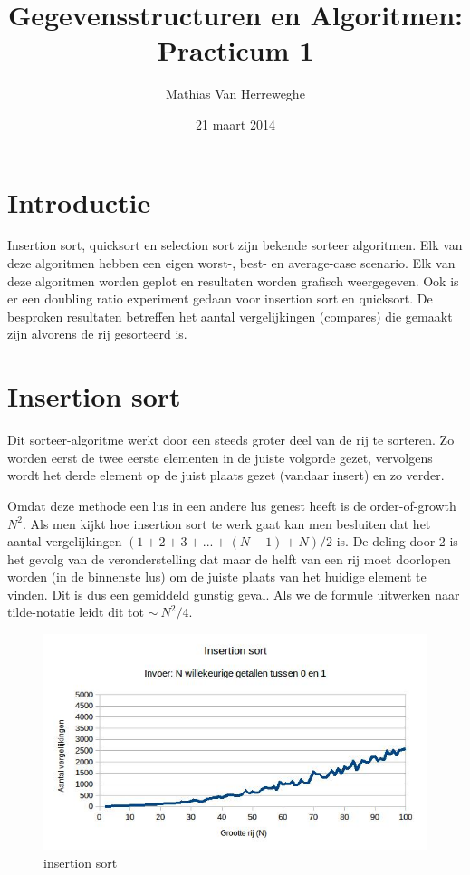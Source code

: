 \documentclass{article}
\title{Gegevensstructuren en Algoritmen: Practicum 1}
\author{Mathias Van Herreweghe }
\date{21 maart 2014}
\begin{document}
\maketitle
\newpage
\section{Introductie}
Insertion sort, quicksort en selection sort zijn bekende sorteer algoritmen. Elk van deze algoritmen hebben een eigen worst-, best- en average-case scenario. Elk van deze algoritmen worden geplot en resultaten worden grafisch weergegeven. Ook is er een doubling ratio experiment gedaan voor insertion sort en quicksort. De besproken resultaten betreffen het aantal vergelijkingen (compares) die gemaakt zijn alvorens de rij gesorteerd is.
\newpage
\section{Insertion sort}
Dit sorteer-algoritme werkt door een steeds groter deel van de rij te sorteren. Zo worden eerst de twee eerste elementen in de juiste volgorde gezet, vervolgens wordt het derde element op de juist plaats gezet (vandaar insert) en zo verder.

Omdat deze methode een lus in een andere lus genest heeft is de order-of-growth $N^2$. Als men kijkt hoe insertion sort te werk gaat kan men besluiten dat het aantal vergelijkingen $(1 + 2 + 3 + ... + (N-1) + N)/2$ is. De deling door 2 is het gevolg van de veronderstelling dat maar de helft van een rij moet doorlopen worden (in de binnenste lus) om de juiste plaats van het huidige element te vinden. Dit is dus een gemiddeld gunstig geval. Als we de formule uitwerken naar tilde-notatie leidt dit tot $\sim\ N^2/4$.

\begin{figure}[h!]
\centering
\includegraphics[scale=0.55]{Insertion_1-100.jpg}
\caption{insertion sort}
\label{fig:Insertion_1-100}
\end{figure}
\end{document}
